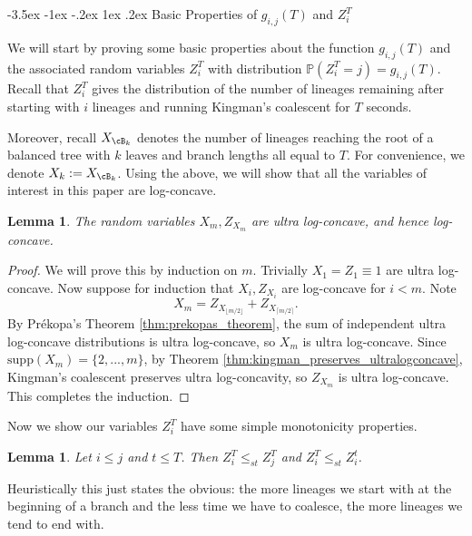 \documentclass[10pt,oneside,reqno]{article}
\makeatletter
\theoremstyle{plain}
\newtheorem{lemma}[theorem]{Lemma}
\theoremstyle{definition}
\numberwithin{equation}{section}
\def\subsection#1{\@startsection {subsection}{2}{0pt}%
{-3.5ex \@plus -1ex \@minus -.2ex}%
{1ex \@plus.2ex}%
{\bf\mathversion{bold}}{#1}}
\renewcommand{\leq}{\leqslant}
\renewcommand{\P}{\mathbb{P}}
\makeatother
\begin{document}


\subsection{Basic Properties of $g_{i,j}(T)$ and $Z^T_i$}
\label{app:basic-coalescent-properties}

We will start by proving some basic properties about the function $g_{i,j}(T)$ and the associated random variables $Z_i^T$ with distribution $\P(Z_i^T = j) = g_{i,j}(T)$. Recall that $Z^T_i$ gives the distribution of the number of lineages remaining after starting with $i$ lineages and running Kingman's coalescent for $T$ seconds.

Moreover, recall $X_{\cB_k}$ denotes the number of lineages reaching the root of a balanced tree with $k$ leaves and branch lengths all equal to $T$. For convenience, we denote $X_k := X_{\cB_k}$. Using the above, we will show that all the variables of interest in this paper are log-concave.

\begin{lemma}
The random variables $X_m, Z_{X_m}$ are ultra log-concave, and hence log-concave.
\label{lem:xm_zxm_are_ultra_log_concave}
\end{lemma}

\begin{proof}
    We will prove this by induction on $m$. Trivially $X_1 = Z_1 \equiv 1$ are ultra log-concave. Now suppose for induction that $X_i, Z_{X_i}$ are log-concave for $i < m$. Note
    \[X_m = Z_{X_{\lfloor m/2 \rfloor}} + Z_{X_{\lceil m/2\rceil}}.\]
    \noindent By Pr\'ekopa's Theorem \ref{thm:prekopas_theorem}, the sum of independent ultra log-concave distributions is ultra log-concave, so $X_m$ is ultra log-concave. Since $\mathrm{supp}(X_m) = \{2,..., m\}$, by Theorem \ref{thm:kingman_preserves_ultralogconcave}, Kingman's coalescent preserves ultra log-concavity, so $Z_{X_m}$ is ultra log-concave. This completes the induction. 
\end{proof}

\noindent Now we show our variables $Z_i^T$ have some simple monotonicity properties.

\begin{lemma}
    Let $i \leq j$ and $t \leq T$. Then $Z_i^T \leq_{st} Z_j^T$ and $Z_{i}^T \leq_{st} Z_i^t$.
    \label{lem:cdf_of_Zi}
\end{lemma}

\noindent Heuristically this just states the obvious: the more lineages we start with at the beginning of a branch and the less time we have to coalesce, the more lineages we tend to end with. 
\end{document}
